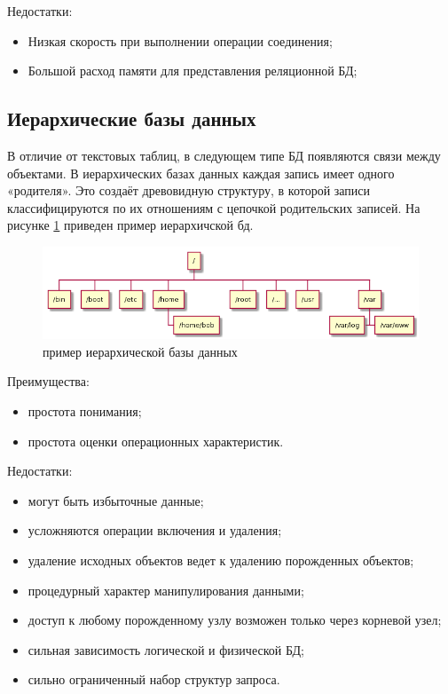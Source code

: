 \hspace{0.6cm} Недостатки:

\begin{itemize}
  \item Низкая скорость при выполнении операции соединения;
  \item Большой расход памяти для представления реляционной БД;
\end{itemize}

\subsection{Иерархические базы данных}
В отличие от текстовых таблиц, в следующем типе БД появляются связи между объектами. В иерархических базах данных каждая запись имеет одного «родителя». Это создаёт древовидную структуру, в которой записи классифицируются по их отношениям с цепочкой родительских записей\cite{web:IerarchiDB}. На рисунке \ref{fig:image12} приведен пример иерархичской бд.

 \begin{figure}[ht!]
  \centering
  \includegraphics[scale=0.5]{IerarchiDB.png}
  \caption{пример иерархической базы данных}
  \label{fig:image12}
\end{figure}

\hspace{0.6cm} Преимущества:

\begin{itemize}
  \item простота понимания;
  \item простота оценки операционных характеристик.
\end{itemize}

\hspace{0.6cm} Недостатки:

\begin{itemize}
  \item могут быть избыточные данные;
  \item усложняются операции включения и удаления;
  \item удаление исходных объектов ведет к удалению порожденных объектов;
  \item процедурный характер манипулирования данными;
  \item доступ к любому порожденному узлу возможен только через корневой узел;
  \item сильная зависимость логической и физической БД;
  \item сильно ограниченный набор структур запроса.
\end{itemize}

